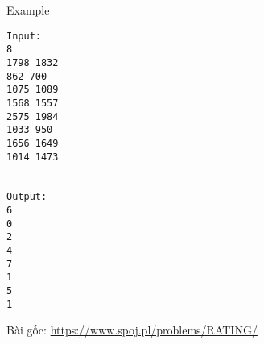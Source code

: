 Example
\begin{verbatim}
Input:
8
1798 1832
862 700
1075 1089
1568 1557
2575 1984
1033 950
1656 1649
1014 1473


Output:
6
0
2
4
7
1
5
1

\end{verbatim}

   Bài gốc:   \href{https://www.spoj.pl/problems/RATING/}{    https://www.spoj.pl/problems/RATING/   }